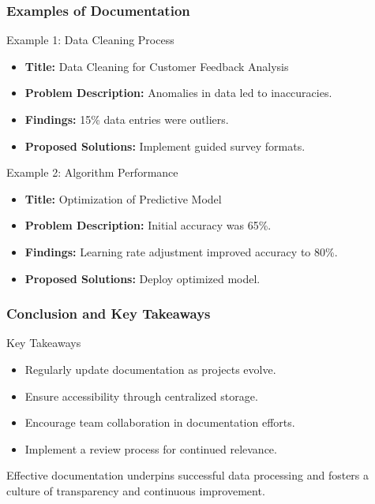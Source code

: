 \documentclass[aspectratio=169]{beamer}
\begin{document}
\begin{frame}[fragile]
    \frametitle{Examples of Documentation}
    \begin{block}{Example 1: Data Cleaning Process}
        \begin{itemize}
            \item \textbf{Title:} Data Cleaning for Customer Feedback Analysis
            \item \textbf{Problem Description:} Anomalies in data led to inaccuracies.
            \item \textbf{Findings:} 15\% data entries were outliers.
            \item \textbf{Proposed Solutions:} Implement guided survey formats.
        \end{itemize}
    \end{block}

    \begin{block}{Example 2: Algorithm Performance}
        \begin{itemize}
            \item \textbf{Title:} Optimization of Predictive Model
            \item \textbf{Problem Description:} Initial accuracy was 65\%.
            \item \textbf{Findings:} Learning rate adjustment improved accuracy to 80\%.
            \item \textbf{Proposed Solutions:} Deploy optimized model.
        \end{itemize}
    \end{block}
\end{frame}

\begin{frame}[fragile]
    \frametitle{Conclusion and Key Takeaways}
    \begin{block}{Key Takeaways}
        \begin{itemize}
            \item Regularly update documentation as projects evolve.
            \item Ensure accessibility through centralized storage.
            \item Encourage team collaboration in documentation efforts.
            \item Implement a review process for continued relevance.
        \end{itemize}
    \end{block}

    Effective documentation underpins successful data processing and fosters a culture of transparency and continuous improvement.
\end{frame}
\end{document}
